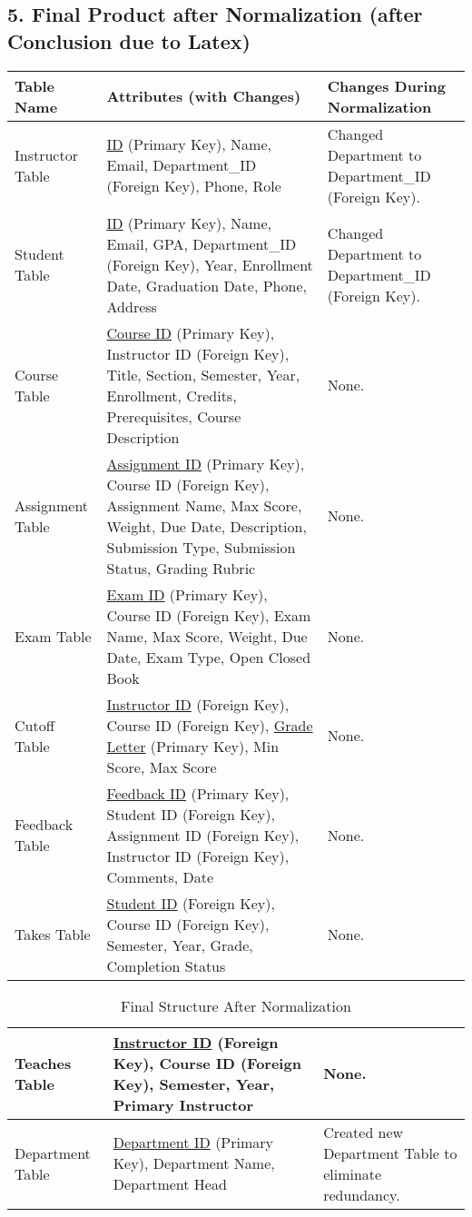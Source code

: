 \documentclass[12pt]{article}
\begin{document}
\subsection*{5. Final Product after Normalization (after Conclusion due to Latex)}
\begin{table}[H]
    \centering
    \begin{tabularx}{\textwidth}{|X|X|X|}
        \hline
        \textbf{Table Name} & \textbf{Attributes (with Changes)} & \textbf{Changes During Normalization} \\
        \hline
        Instructor Table & \underline{ID} (Primary Key), Name, Email, Department\_ID (Foreign Key), Phone, Role & Changed Department to Department\_ID (Foreign Key). \\
        \hline
        Student Table & \underline{ID} (Primary Key), Name, Email, GPA, Department\_ID (Foreign Key), Year, Enrollment Date, Graduation Date, Phone, Address & Changed Department to Department\_ID (Foreign Key). \\
        \hline
        Course Table & \underline{Course ID} (Primary Key), Instructor ID (Foreign Key), Title, Section, Semester, Year, Enrollment, Credits, Prerequisites, Course Description & None. \\
        \hline
        Assignment Table & \underline{Assignment ID} (Primary Key), Course ID (Foreign Key), Assignment Name, Max Score, Weight, Due Date, Description, Submission Type, Submission Status, Grading Rubric & None. \\
        \hline
        Exam Table & \underline{Exam ID} (Primary Key), Course ID (Foreign Key), Exam Name, Max Score, Weight, Due Date, Exam Type, Open Closed Book & None. \\
        \hline
        Cutoff Table & \underline{Instructor ID} (Foreign Key), Course ID (Foreign Key), \underline{Grade Letter} (Primary Key), Min Score, Max Score & None. \\
        \hline
        Feedback Table & \underline{Feedback ID} (Primary Key), Student ID (Foreign Key), Assignment ID (Foreign Key), Instructor ID (Foreign Key), Comments, Date & None. \\
        \hline
        Takes Table & \underline{Student ID} (Foreign Key), Course ID (Foreign Key), Semester, Year, Grade, Completion Status & None. \\
        \hline
        \end{tabularx}
 \end{table}
\begin{table}[H]
    \centering
    \begin{tabularx}{\textwidth}{|X|X|X|}
        \hline
        Teaches Table & \underline{Instructor ID} (Foreign Key), Course ID (Foreign Key), Semester, Year, Primary Instructor & None. \\
        \hline
        Department Table & \underline{Department ID} (Primary Key), Department Name, Department Head & Created new Department Table to eliminate redundancy. \\
        \hline
    \end{tabularx}
    \caption{Final Structure After Normalization}
    \label{tab:final_structure}
\end{table}
\end{document}
